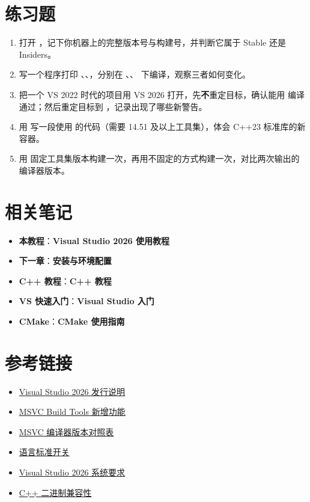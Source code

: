 \section{练习题}
\begin{enumerate}
  \item 打开 ，记下你机器上的完整版本号与构建号，并判断它属于 Stable 还是 Insiders。
  \item 写一个程序打印 、、，分别在 、、 下编译，观察三者如何变化。
  \item 把一个 VS 2022 时代的项目用 VS 2026 打开，先\textbf{不}重定目标，确认能用  编译通过；然后重定目标到 ，记录出现了哪些新警告。
  \item 用  写一段使用  的代码（需要 14.51 及以上工具集），体会 C++23 标准库的新容器。
  \item 用  固定工具集版本构建一次，再用不固定的方式构建一次，对比两次输出的编译器版本。
\end{enumerate}

\section{相关笔记}
\begin{itemize}
  \item \textbf{本教程}：\textbf{Visual Studio 2026 使用教程}
  \item \textbf{下一章}：\textbf{安装与环境配置}
  \item \textbf{C++ 教程}：\textbf{C++ 教程}
  \item \textbf{VS 快速入门}：\textbf{Visual Studio 入门}
  \item \textbf{CMake}：\textbf{CMake 使用指南}
\end{itemize}

\section{参考链接}
\begin{itemize}
  \item \href{https://learn.microsoft.com/zh-cn/visualstudio/releases/2026/release-notes}{Visual Studio 2026 发行说明}
  \item \href{https://learn.microsoft.com/zh-cn/cpp/overview/what-s-new-for-msvc}{MSVC Build Tools 新增功能}
  \item \href{https://learn.microsoft.com/zh-cn/cpp/overview/compiler-versions}{MSVC 编译器版本对照表}
  \item \href{https://learn.microsoft.com/zh-cn/cpp/build/reference/std-specify-language-standard-version}{ 语言标准开关}
  \item \href{https://learn.microsoft.com/en-us/visualstudio/releases/2026/vs-system-requirements}{Visual Studio 2026 系统要求}
  \item \href{https://learn.microsoft.com/zh-cn/cpp/porting/binary-compat-2015-2017}{C++ 二进制兼容性}
\end{itemize}
